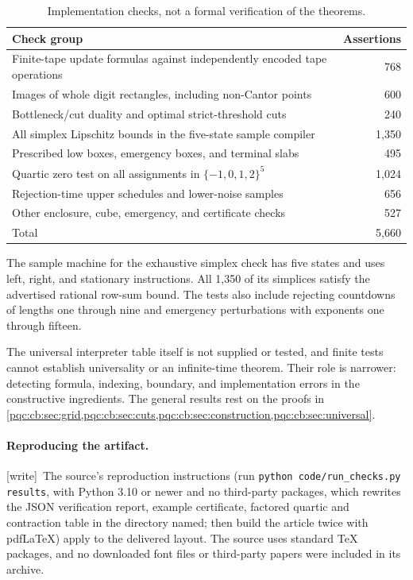 \documentclass[11pt,letterpaper]{article}
\numberwithin{equation}{section}
\theoremstyle{definition}
\theoremstyle{remark}
\newcommand{\wtag}{\textup{[write]}}
\begin{document}
\begin{table}[ht]
\centering
\begin{tabularx}{\textwidth}{@{}Xr@{}}
\toprule
Check group & Assertions\\
\midrule
Finite-tape update formulas against independently encoded tape operations & 768\\
Images of whole digit rectangles, including non-Cantor points & 600\\
Bottleneck/cut duality and optimal strict-threshold cuts & 240\\
All simplex Lipschitz bounds in the five-state sample compiler & 1,350\\
Prescribed low boxes, emergency boxes, and terminal slabs & 495\\
Quartic zero test on all assignments in $\{-1,0,1,2\}^5$ & 1,024\\
Rejection-time upper schedules and lower-noise samples & 656\\
Other enclosure, cube, emergency, and certificate checks & 527\\
\midrule
Total & 5,660\\
\bottomrule
\end{tabularx}
\caption{Implementation checks, not a formal verification of the theorems.}
\label{pqc:cb:tab:tests}
\end{table}

The sample machine for the exhaustive simplex check has five states and uses
left, right, and stationary instructions.  All 1,350 of its simplices satisfy
the advertised rational row-sum bound.  The tests also include rejecting
countdowns of lengths one through nine and emergency perturbations with
exponents one through fifteen.

The universal interpreter table itself is not supplied or tested, and finite
tests cannot establish universality or an infinite-time theorem.  Their role
is narrower: detecting formula, indexing, boundary, and implementation errors
in the constructive ingredients.  The general results rest on the proofs in
\cref{pqc:cb:sec:grid,pqc:cb:sec:cuts,pqc:cb:sec:construction,pqc:cb:sec:universal}.

\paragraph{Reproducing the artifact.}
\wtag\ The source's reproduction instructions (run
\texttt{python code/run\_checks.py results}, with Python 3.10 or newer and no
third-party packages, which rewrites the JSON verification report, example
certificate, factored quartic and contraction table in the directory named;
then build the article twice with pdfLaTeX) apply to the delivered layout.
The source uses standard \TeX{} packages, and no downloaded font files or
third-party papers were included in its archive.
\end{document}
